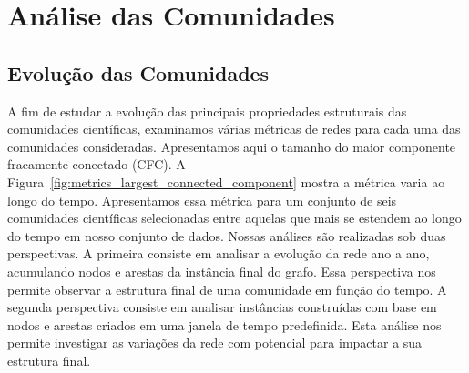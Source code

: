 \documentclass[12pt]{article}
\begin{document}
\section{Análise das Comunidades}

\subsection{Evolução das Comunidades}

A fim de estudar a evolução das principais propriedades estruturais das comunidades científicas, examinamos várias métricas 
de redes para cada uma das comunidades consideradas. Apresentamos aqui o tamanho do maior componente fracamente conectado 
(CFC). A Figura~\ref{fig:metrics_largest_connected_component}
mostra a métrica varia ao longo do tempo. Apresentamos essa métrica para um conjunto de seis 
comunidades científicas selecionadas entre aquelas que mais se estendem ao longo do tempo em nosso conjunto de dados.
Nossas análises são realizadas sob duas perspectivas. A primeira consiste em analisar a evolução da rede ano a ano, acumulando 
nodos e arestas da instância final do grafo. Essa perspectiva nos permite observar a estrutura final de uma 
comunidade em função do tempo. A segunda perspectiva consiste em analisar instâncias construídas com base em nodos e 
arestas criados em uma janela de tempo predefinida. Esta análise 
nos permite investigar as variações da rede com potencial para impactar a sua estrutura final.
\end{document}
